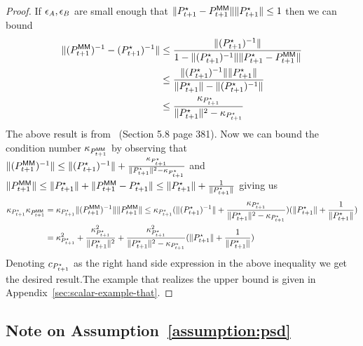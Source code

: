 \begin{proof}
If $\epsilon_A, \epsilon_B$ are small enough that $\|P^\star_{t+1} -
P^\mathsf{MM}_{t+1}\|\|P^\star_{t+1}\| \leq 1$ then we can bound
\begin{align*}
  \|(P^\mathsf{MM}_{t+1})^{-1} - (P^\star_{t+1})^{-1}\| &\leq
  \frac{\|(P^\star_{t+1})^{-1}\|}{1 - \|(P^\star_{t+1})^{-1}\|\|P^\star_{t+1}
                                               - P^\mathsf{MM}_{t+1}\|} \\
  &\leq \frac{\|(P^\star_{t+1})^{-1}\|\|P^\star_{t+1}\|}{\|P^\star_{t+1}\| -
    \|(P^\star_{t+1})^{-1}\|} \\
  &\leq \frac{\kappa_{P^\star_{t+1}}}{\|P^\star_{t+1}\|^2 - \kappa_{P^\star_{t+1}}}
\end{align*}
The above result is from~\cite{horn12} (Section 5.8 page 381). Now we
can bound the condition number $\kappa_{P^\mathsf{MM}_{t+1}}$ by observing that
$\|(P^\mathsf{MM}_{t+1})^{-1}\| \leq \|(P^\star_{t+1})^{-1}\| +
\frac{\kappa_{P^\star_{t+1}}}{\|P^\star_{t+1}\|^2 - \kappa_{P^\star_{t+1}}}$
and $\|P^\mathsf{MM}_{t+1}\| \leq \|P^\star_{t+1}\| + \|P^\mathsf{MM}_{t+1} -
P^\star_{t+1}\| \leq \|P^\star_{t+1}\| + \frac{1}{\|P^\star_{t+1}\|}$ giving
us
\begin{align*}
  \kappa_{P^\star_{t+1}}\kappa_{P^\mathsf{MM}_{t+1}} &= \kappa_{P^\star_{t+1}}\|(P^\mathsf{MM}_{t+1})^{-1}\|\|P^\mathsf{MM}_{t+1}\| \leq \kappa_{P^\star_{t+1}}(\|(P^\star_{t+1})^{-1}\| +
\frac{\kappa_{P^\star_{t+1}}}{\|P^\star_{t+1}\|^2 -
                        \kappa_{P^\star_{t+1}}})(\|P^\star_{t+1}\| +
                        \frac{1}{\|P^\star_{t+1}\|}) \\
  &= \kappa_{P^\star_{t+1}}^2 +
    \frac{\kappa_{P^\star_{t+1}}^2}{\|P^\star_{t+1}\|^2} + \frac{\kappa_{P^\star_{t+1}}^2}{\|P^\star_{t+1}\|^2 -
                        \kappa_{P^\star_{t+1}}}(\|P^\star_{t+1}\| +
                        \frac{1}{\|P^\star_{t+1}\|})
\end{align*}
Denoting $c_{P^\star_{t+1}}$ as the right hand side expression in the
above inequality we get the desired result.The example that
realizes the upper bound is given in Appendix~\ref{sec:scalar-example-that}.

\end{proof}

\subsection{Note on Assumption~\ref{assumption:psd}}
\label{sec:assumpt-refass}

